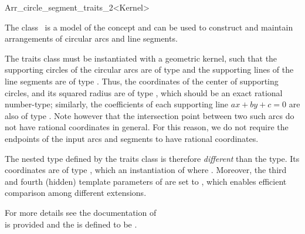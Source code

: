 
\ccRefPageBegin
\begin{ccRefClass}{Arr_circle_segment_traits_2<Kernel>}

\ccDefinition

The class \ccRefName\ is a model of the  concept
and can be used to construct and maintain arrangements of circular arcs
and line segments.

The traits class must be instantiated with a geometric kernel, such that
the supporting circles of the circular arcs are of type 
and the supporting lines of the line segments are of type .
Thus, the coordinates of the center of supporting circles, and its squared
radius are of type , which should be an exact rational
number-type; similarly, the coefficients of each supporting line
$ax + by + c = 0$ are also of type . Note however that
the intersection point between two such arcs do not have rational coordinates
in general. For this reason, we do not require the endpoints of the input arcs
and segments to have rational coordinates.

The nested  type defined by the traits class is therefore
{\em different} than the  type. Its coordinates are
of type , which an instantiation of 
 where .
Moreover, the third and fourth (hidden) template parameters of 
 are set to , which 
enables efficient comparison among different extensions. 

For more details see the documentation of \\

 is provided and the 
is defined to be .

 
\ccIsModel
     \\



\end{ccRefClass}
